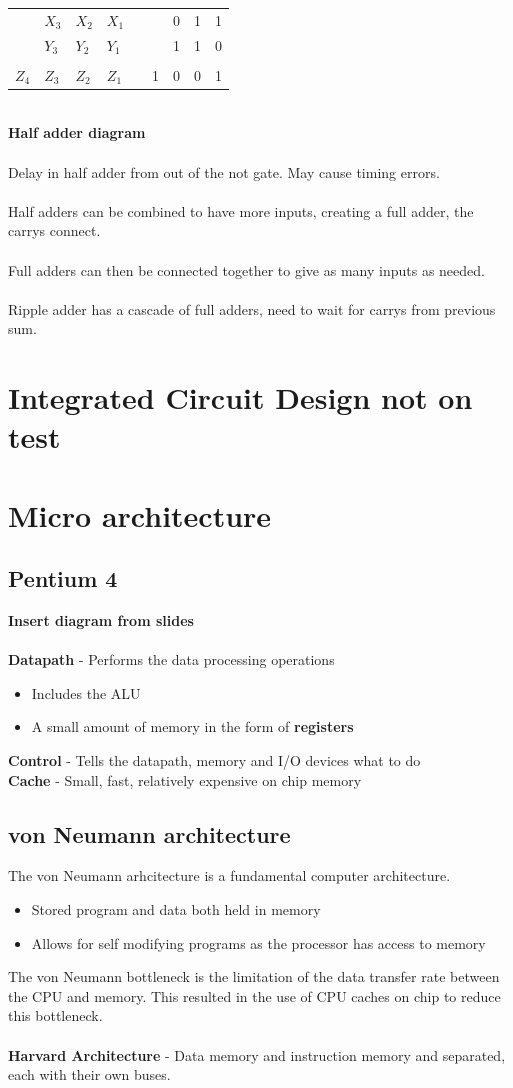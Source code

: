 \documentclass{article}[18pt]
\begin{document}
\begin{tabular}{lllllllll}
      & $X_3$ & $X_2$ & $X_1$ &  &   & 0 & 1 & 1 \\
      & $Y_3$ & $Y_2$ & $Y_1$ &  &   & 1 & 1 & 0 \\
      &       &       &       &  &   &   &   &   \\ \cline{1-4} \cline{6-9} 
$Z_4$ & $Z_3$ & $Z_2$ & $Z_1$ &  & 1 & 0 & 0 & 1
\end{tabular}
\\
\textbf{Half adder diagram}\\
\\
Delay in half adder from out of the not gate. May cause timing errors.\\
\\
Half adders can be combined to have more inputs, creating a full adder, the carrys connect.\\
\\
Full adders can then be connected together to give as many inputs as needed.\\
\\
Ripple adder has a cascade of full adders, need to wait for carrys from previous sum.
\section{Integrated Circuit Design not on test}
\section{Micro architecture }
\subsection{Pentium 4}
\textbf{Insert diagram from slides}\\
\\
\textbf{Datapath} - Performs the data processing operations
\begin{itemize}
\item Includes the ALU
\item A small amount of memory in the form of \textbf{registers}
\end{itemize}
\textbf{Control} - Tells the datapath, memory and I/O devices what to do\\
\textbf{Cache} - Small, fast, relatively expensive on chip memory
\subsection{von Neumann architecture}
The von Neumann arhcitecture is a fundamental computer architecture.
\begin{itemize}
\item Stored program and data both held in memory
\item Allows for self modifying programs as the processor has access to memory
\end{itemize}
The von Neumann bottleneck is the limitation of the data transfer rate between the CPU and memory. This resulted in the use of CPU caches on chip to reduce this bottleneck.\\
\\
\textbf{Harvard Architecture} - Data memory and instruction memory and separated, each with their own buses.
\end{document}
